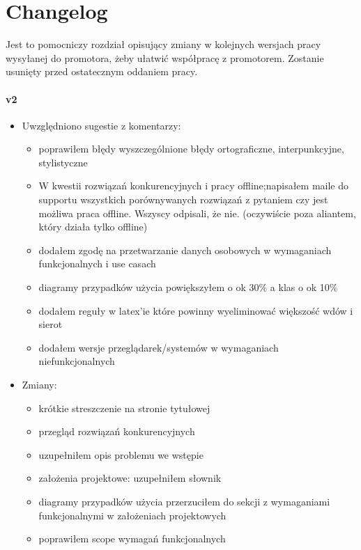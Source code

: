 \chapter*{Changelog}\label{ch:changelog}

Jest to pomocniczy rozdział opisujący zmiany w kolejnych wersjach pracy wysyłanej do promotora, żeby ułatwić współpracę z promotorem.
Zostanie usunięty przed ostatecznym oddaniem pracy.

\subsubsection{v2}
\begin{itemize}
\item Uwzględniono sugestie z komentarzy:
    \begin{itemize}
	\item poprawiłem błędy wyszczególnione błędy ortograficzne, interpunkcyjne, stylistyczne
	\item W kwestii rozwiązań konkurencyjnych i pracy offline;napisałem maile do supportu wszystkich porównywanych rozwiązań z pytaniem czy jest możliwa praca offline. Wszyscy odpisali, że nie. (oczywiście poza aliantem, który działa tylko offline)
	\item dodałem zgodę na przetwarzanie danych osobowych w wymaganiach funkcjonalnych i use casach
	\item diagramy przypadków użycia powiększyłem o ok 30\% a klas o ok 10\%
	\item dodałem reguły w latex'ie które powinny wyeliminować większość wdów i sierot
	\item dodałem wersje przeglądarek/systemów w wymaganiach niefunkcjonalnych
	\end{itemize}
\item Zmiany:
    \begin{itemize}
	\item krótkie streszczenie na stronie tytułowej
	\item przegląd rozwiązań konkurencyjnych
	\item uzupełniłem opis problemu we wstępie
	\item założenia projektowe: uzupełniłem słownik
	\item diagramy przypadków użycia przerzuciłem do sekcji z wymaganiami funkcjonalnymi w założeniach projektowych
	\item poprawiłem scope wymagań funkcjonalnych

\end{itemize}
\end{itemize}

